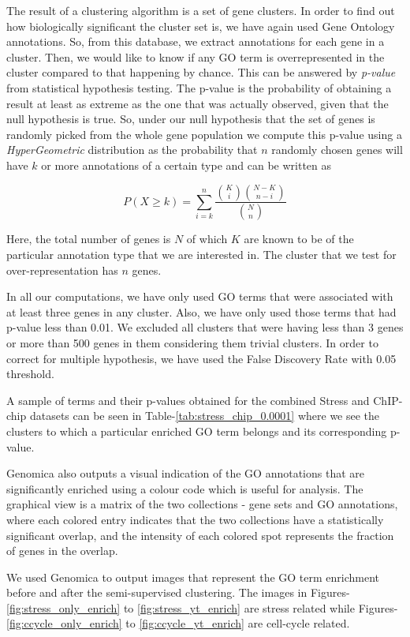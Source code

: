 The result of a clustering algorithm is a set of gene clusters. In order to find out how biologically significant the cluster set is, we have again used 
Gene Ontology \citep{GO} annotations. So, from this database, we extract annotations for each gene in a cluster. Then, we would like to know if any GO term is  overrepresented in the cluster 
compared to that happening by chance. This can be answered by \textit{p-value} from statistical hypothesis testing. 
The p-value is the probability of obtaining a result at least as extreme as the one that was actually observed, given that the null hypothesis is true. 
So, under our null hypothesis that the set of genes is randomly picked from the whole gene population we compute this p-value using a \textit{HyperGeometric} distribution 
as the probability that $n$ randomly chosen genes will have $k$ or more annotations of a certain type and can be written as

\[
P(X \geq k) = \sum_{i=k}^{n} \frac{\binom{K}{i} \binom{N-K}{n-i}}{\binom {N}{n}}
\]
 
Here, the total number of genes is $N$ of which $K$ are known to be of the particular annotation type that we are interested in. The cluster that we test for over-representation has $n$ genes.

In all our computations, we have only used GO terms that were associated with at least three genes in any cluster. Also, we have only used those terms that had p-value less than 0.01. 
We excluded all clusters that were having less than 3 genes or more than 500 genes in them considering them trivial clusters. In order to correct for multiple hypothesis, we have used the False Discovery Rate with 0.05 threshold.  


A sample of terms and their p-values obtained for the combined Stress and ChIP-chip datasets can be seen in 
Table-\ref{tab:stress_chip_0.0001} where we see the clusters to which a particular 
enriched GO term belongs and its corresponding p-value.   

Genomica also outputs a visual indication of the GO annotations that are significantly enriched using a colour code which is useful for analysis. The graphical view is a 
matrix of the two collections - gene sets and GO annotations, where each colored entry indicates that the two collections have a statistically significant 
overlap, and the intensity of each colored spot represents the fraction of genes in the overlap. 

We used Genomica to output images that represent the GO term enrichment before and after the semi-supervised clustering. 
The images in Figures-\ref{fig:stress_only_enrich} to \ref{fig:stress_yt_enrich} are stress related while Figures-\ref{fig:ccycle_only_enrich} to \ref{fig:ccycle_yt_enrich} are cell-cycle related.

